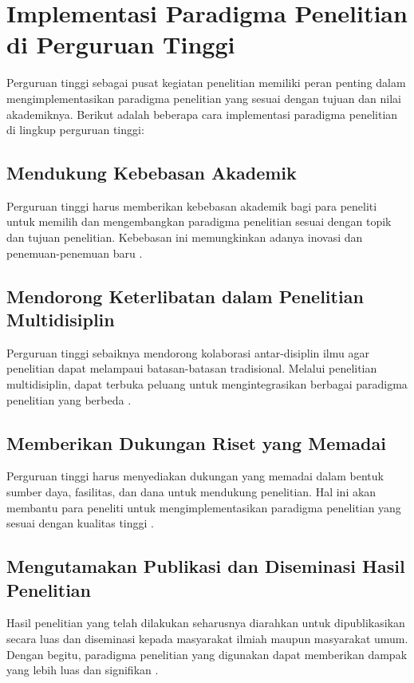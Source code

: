 \section{Implementasi Paradigma Penelitian di Perguruan Tinggi}
Perguruan tinggi sebagai pusat kegiatan penelitian memiliki peran penting dalam mengimplementasikan paradigma penelitian yang sesuai dengan tujuan dan nilai akademiknya. Berikut adalah beberapa cara implementasi paradigma penelitian di lingkup perguruan tinggi:

\subsection{Mendukung Kebebasan Akademik}
Perguruan tinggi harus memberikan kebebasan akademik bagi para peneliti untuk memilih dan mengembangkan paradigma penelitian sesuai dengan topik dan tujuan penelitian. Kebebasan ini memungkinkan adanya inovasi dan penemuan-penemuan baru \cite{patton2014qualitative}.

\subsection{Mendorong Keterlibatan dalam Penelitian Multidisiplin}
Perguruan tinggi sebaiknya mendorong kolaborasi antar-disiplin ilmu agar penelitian dapat melampaui batasan-batasan tradisional. Melalui penelitian multidisiplin, dapat terbuka peluang untuk mengintegrasikan berbagai paradigma penelitian yang berbeda \cite{lincoln1985naturalistic}.

\subsection{Memberikan Dukungan Riset yang Memadai}
Perguruan tinggi harus menyediakan dukungan yang memadai dalam bentuk sumber daya, fasilitas, dan dana untuk mendukung penelitian. Hal ini akan membantu para peneliti untuk mengimplementasikan paradigma penelitian yang sesuai dengan kualitas tinggi \cite{mertens2014research}.

\subsection{Mengutamakan Publikasi dan Diseminasi Hasil Penelitian}
Hasil penelitian yang telah dilakukan seharusnya diarahkan untuk dipublikasikan secara luas dan diseminasi kepada masyarakat ilmiah maupun masyarakat umum. Dengan begitu, paradigma penelitian yang digunakan dapat memberikan dampak yang lebih luas dan signifikan \cite{stake1995art}.
